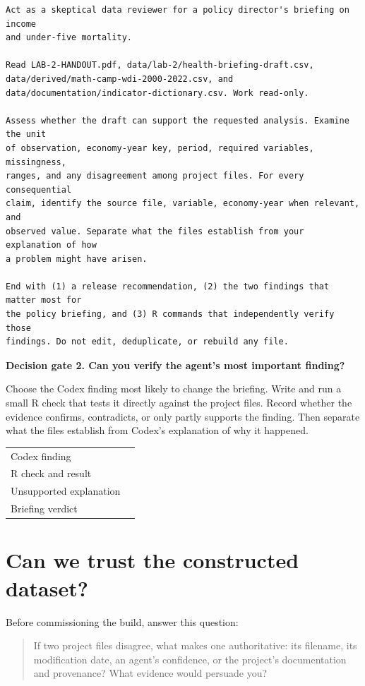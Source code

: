 \documentclass[11pt]{article}
\newcommand{\gate}[2]{\medskip\noindent\textbf{Decision gate #1. #2}\par}
\begin{document}
\begin{lstlisting}
Act as a skeptical data reviewer for a policy director's briefing on income
and under-five mortality.

Read LAB-2-HANDOUT.pdf, data/lab-2/health-briefing-draft.csv,
data/derived/math-camp-wdi-2000-2022.csv, and
data/documentation/indicator-dictionary.csv. Work read-only.

Assess whether the draft can support the requested analysis. Examine the unit
of observation, economy-year key, period, required variables, missingness,
ranges, and any disagreement among project files. For every consequential
claim, identify the source file, variable, economy-year when relevant, and
observed value. Separate what the files establish from your explanation of how
a problem might have arisen.

End with (1) a release recommendation, (2) the two findings that matter most for
the policy briefing, and (3) R commands that independently verify those
findings. Do not edit, deduplicate, or rebuild any file.
\end{lstlisting}

\gate{2}{Can you verify the agent's most important finding?}

Choose the Codex finding most likely to change the briefing. Write and run a
small R check that tests it directly against the project files. Record whether
the evidence confirms, contradicts, or only partly supports the finding. Then
separate what the files establish from Codex's explanation of why it happened.

\noindent\begin{tabularx}{\textwidth}{@{}p{}Y@{}}
\toprule
Codex finding & \rule{0pt}{1.8em} \\
R check and result & \rule{0pt}{1.8em} \\
Unsupported explanation & \rule{0pt}{1.8em} \\
Briefing verdict & \rule{0pt}{1.8em} \\
\bottomrule
\end{tabularx}

\newpage
\section*{Can we trust the constructed dataset?}

Before commissioning the build, answer this question:

\begin{quote}
If two project files disagree, what makes one authoritative: its filename, its
modification date, an agent's confidence, or the project's documentation and
provenance? What evidence would persuade you?
\end{quote}
\end{document}
